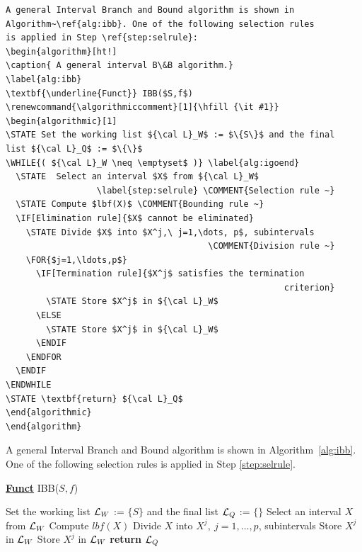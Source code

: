 \documentclass[withtitlethanks]{actacyb}
\begin{document}
\begin{verbatim}
A general Interval Branch and Bound algorithm is shown in 
Algorithm~\ref{alg:ibb}. One of the following selection rules
is applied in Step \ref{step:selrule}:
\begin{algorithm}[ht!]
\caption{ A general interval B\&B algorithm.} 
\label{alg:ibb} 
\textbf{\underline{Funct}} IBB($S,f$)
\renewcommand{\algorithmiccomment}[1]{\hfill {\it #1}}
\begin{algorithmic}[1]
\STATE Set the working list ${\cal L}_W$ := $\{S\}$ and the final 
list ${\cal L}_Q$ := $\{\}$     
\WHILE{( ${\cal L}_W \neq \emptyset$ )} \label{alg:igoend}
  \STATE  Select an interval $X$ from ${\cal L}_W$
                  \label{step:selrule} \COMMENT{Selection rule ~}  
  \STATE Compute $lbf(X)$ \COMMENT{Bounding rule ~}		  
  \IF[Elimination rule]{$X$ cannot be eliminated}
    \STATE Divide $X$ into $X^j,\ j=1,\dots, p$, subintervals   
                                        \COMMENT{Division rule ~}
    \FOR{$j=1,\ldots,p$}
      \IF[Termination rule]{$X^j$ satisfies the termination 
                                                       criterion}
        \STATE Store $X^j$ in ${\cal L}_W$ 
      \ELSE
        \STATE Store $X^j$ in ${\cal L}_W$ 
      \ENDIF
    \ENDFOR  
  \ENDIF
\ENDWHILE
\STATE \textbf{return} ${\cal L}_Q$
\end{algorithmic}
\end{algorithm}
\end{verbatim}


A general Interval Branch and Bound algorithm is shown in Algorithm~\ref{alg:ibb}. One of the following selection rules is applied in Step \ref{step:selrule}.

\begin{algorithm}[ht!]
\caption{ A general interval B\&B algorithm.} 
\label{alg:ibb} 
\textbf{\underline{Funct}} IBB($S,f$)
\renewcommand{\algorithmiccomment}[1]{\hfill {\it #1}}
\begin{algorithmic}[1]
\STATE Set the working list ${\cal L}_W$ := $\{S\}$ and the final list ${\cal L}_Q$ := $\{\}$     
 \label{alg:igoend}
  \STATE  Select an interval $X$ from ${\cal L}_W$ \label{step:selrule}  
  \STATE Compute $lbf(X)$ 		  
    \STATE Divide $X$ into $X^j,\ j=1,\dots, p$, subintervals   
        \STATE Store $X^j$ in ${\cal L}_W$ 
      \ELSE
        \STATE Store $X^j$ in ${\cal L}_W$ 
      \ENDIF
    \ENDFOR  
  \ENDIF
\ENDWHILE
\STATE \textbf{return} ${\cal L}_Q$
\end{algorithmic}
\end{algorithm}
\end{document}
